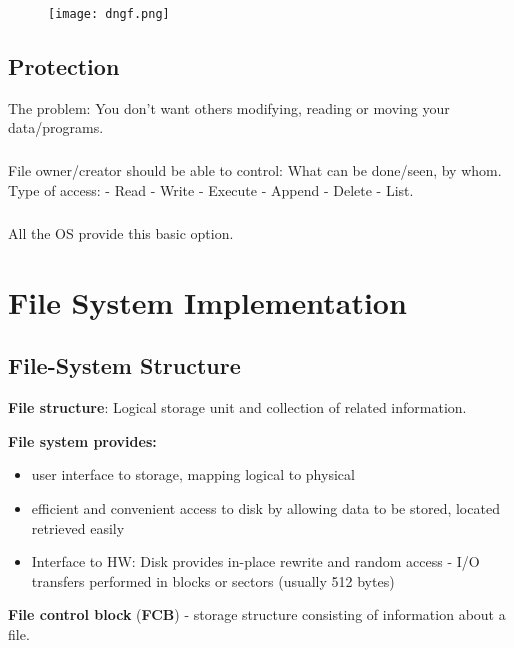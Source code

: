 \begin{figure}[h!]
    \centering
    \texttt{[image: dngf.png]}
\end{figure}

\section{Protection}

The problem:
You don’t want others modifying, reading or moving your
data/programs.

\paragraph{}
 
File owner/creator should be able to control: What can be done/seen, by whom.
Type of access: - Read - Write - Execute - Append - Delete - List.

\paragraph{}
All the OS provide  this basic option.

\chapter{File System Implementation}

\section{File-System Structure}

\textbf{File structure}:  Logical storage unit and collection of related information.

\textbf{File system provides: }

\begin{itemize}
    \item user interface to storage, mapping logical to physical
    \item efficient and convenient access to disk by allowing data to be stored, located retrieved easily
    \item Interface to HW: Disk provides in-place rewrite and random access - I/O transfers performed in blocks or sectors (usually 512 bytes)
\end{itemize}

\textbf{File control block} (\textbf{FCB}) - storage structure consisting of information about a file.

